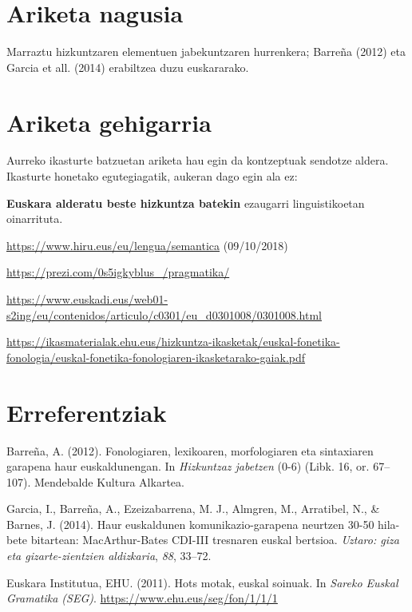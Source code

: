 \documentclass[
]{book}
\begin{document}
\hypertarget{T2A4}{%
\section*{Ariketa nagusia}\label{T2A4}}

Marraztu hizkuntzaren elementuen jabekuntzaren hurrenkera; Barreña (2012) eta Garcia et all. (2014) erabiltzea duzu euskararako.

\hypertarget{T2A5}{%
\section*{Ariketa gehigarria}\label{T2A5}}

Aurreko ikasturte batzuetan ariketa hau egin da kontzeptuak sendotze aldera. Ikasturte honetako egutegiagatik, aukeran dago egin ala ez:

\textbf{Euskara alderatu beste hizkuntza batekin} ezaugarri linguistikoetan oinarrituta.

\url{https://www.hiru.eus/eu/lengua/semantica} (09/10/2018)

\url{https://prezi.com/0s5igkyblus_/pragmatika/}

\url{https://www.euskadi.eus/web01-s2ing/eu/contenidos/articulo/c0301/eu_d0301008/0301008.html}

\url{https://ikasmaterialak.ehu.eus/hizkuntza-ikasketak/euskal-fonetika-fonologia/euskal-fonetika-fonologiaren-ikasketarako-gaiak.pdf}

\hypertarget{T2E}{%
\section*{Erreferentziak}\label{T2E}}

Barreña, A. (2012). Fonologiaren, lexikoaren, morfologiaren eta sintaxiaren garapena haur euskaldunengan. In \emph{Hizkuntzaz jabetzen} (0-6) (Libk. 16, or. 67--107). Mendebalde Kultura Alkartea.

Garcia, I., Barreña, A., Ezeizabarrena, M. J., Almgren, M., Arratibel, N., \& Barnes, J. (2014). Haur euskaldunen komunikazio-garapena neurtzen 30-50 hila-bete bitartean: MacArthur-Bates CDI-III tresnaren euskal bertsioa. \emph{Uztaro: giza eta gizarte-zientzien aldizkaria}, \emph{88}, 33--72.

Euskara Institutua, EHU. (2011). Hots motak, euskal soinuak. In \emph{Sareko Euskal Gramatika (SEG)}. \url{https://www.ehu.eus/seg/fon/1/1/1}
\end{document}
